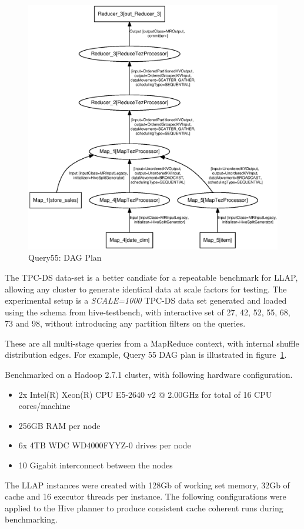 \begin{figure}[bthp]
\centering
\includegraphics[width=0.8\columnwidth]{figures/q55.eps}
\caption{Query55: DAG Plan}
\label{fig:q55}
\end{figure} 

The TPC-DS data-set is a better candiate for a repeatable benchmark for LLAP, allowing any cluster to generate
identical data at scale factors for testing. The experimental setup is a \emph{SCALE=1000} TPC-DS data set generated
and loaded using the schema from hive-testbench\cite{testbench}, with interactive set of 27, 42, 52, 55, 68, 73 and 98, 
without introducing any partition filters on the queries.

These are all multi-stage queries from a MapReduce context, with internal shuffle distribution edges. For example, 
Query 55 DAG plan is illustrated in figure~\ref{fig:q55}.  

Benchmarked on a Hadoop 2.7.1 cluster, with following hardware configuration.

\begin{itemize}
\item 2x Intel(R) Xeon(R) CPU E5-2640 v2 @ 2.00GHz for total of 16 CPU cores/machine
\item 256GB RAM per node
\item 6x 4TB WDC WD4000FYYZ-0 drives per node
\item 10 Gigabit interconnect between the nodes
\end{itemize}

The LLAP instances were created with 128Gb of working set memory, 32Gb of cache and 16 executor threads per
instance. The following configurations were applied to the Hive planner to produce consistent cache coherent 
runs during benchmarking.

